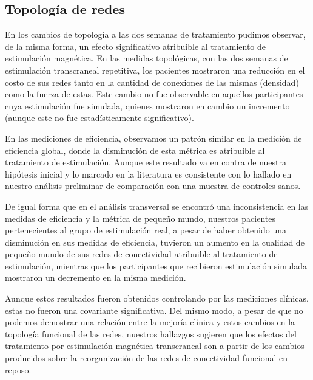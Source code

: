 \subsection{Topología de redes}
En los cambios de topología a las dos semanas de tratamiento pudimos observar, de la misma forma, un efecto significativo atribuible al tratamiento de estimulación magnética. En las medidas topológicas, con las dos semanas de estimulación transcraneal repetitiva, los pacientes mostraron una reducción en el costo de sus redes tanto en la cantidad de conexiones de las mismas (densidad) como la fuerza de estas. Este cambio no fue observable en aquellos participantes cuya estimulación fue simulada, quienes mostraron en cambio un incremento (aunque este no fue estadísticamente significativo).\par
En las mediciones de eficiencia, observamos un patrón similar en la medición de eficiencia global, donde la disminución de esta métrica es atribuible al tratamiento de estimulación. Aunque este resultado va en contra de nuestra hipótesis inicial y lo marcado en la literatura \parencite{Wang2015a} es consistente con lo hallado en nuestro análisis preliminar de comparación con una muestra de controles sanos. \par
De igual forma que en el análisis transversal se encontró una inconsistencia en las medidas de eficiencia y la métrica de pequeño mundo, nuestros pacientes pertenecientes al grupo de estimulación real, a pesar de haber obtenido una disminución en sus medidas de eficiencia, tuvieron un aumento en la cualidad de pequeño mundo de sus redes de conectividad atribuible al tratamiento de estimulación, mientras que los participantes que recibieron estimulación simulada mostraron un decremento en la misma medición. \par
Aunque estos resultados fueron obtenidos controlando por las mediciones clínicas, estas no fueron una covariante significativa. Del mismo modo, a pesar de que no podemos demostrar una relación entre la mejoría clínica y estos cambios en la topología funcional de las redes, nuestros hallazgos sugieren que los efectos del tratamiento por estimulación magnética transcraneal son a partir de los cambios producidos sobre la reorganización de las redes de conectividad funcional en reposo.

